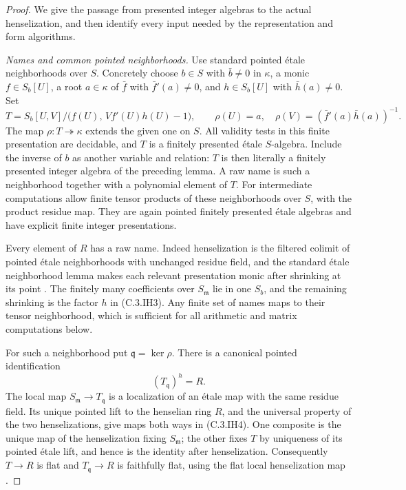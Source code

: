 \begin{proof}
We give the passage from presented integer algebras to the actual
henselization, and then identify every input needed by the representation
and form algorithms.

\emph{Names and common pointed neighborhoods.}
Use standard pointed \'etale neighborhoods over $S$.
Concretely choose $b\in S$ with $\bar b\ne0$ in $\kappa$, a monic
$f\in S_b[U]$, a root $a\in\kappa$ of $\bar f$ with
$\bar f'(a)\ne0$, and $h\in S_b[U]$ with $\bar h(a)\ne0$.
Set
\[
 T=S_b[U,V]/\bigl(f(U),\,Vf'(U)h(U)-1\bigr),\qquad
 \rho(U)=a,\quad \rho(V)=(\bar f'(a)\bar h(a))^{-1}.       \tag{C.3.IH3}
\]
The map $\rho:T\twoheadrightarrow\kappa$ extends the given one on $S$.
All validity tests in this finite presentation are decidable, and $T$ is
a finitely presented \'etale $S$-algebra.
Include the inverse of $b$ as another variable and relation: $T$ is then
literally a finitely presented integer algebra of the preceding lemma.
A raw name is such a neighborhood together with a polynomial element of $T$.
For intermediate computations allow finite tensor products of these
neighborhoods over $S$, with the product residue map.
They are again pointed finitely presented \'etale algebras and have explicit
finite integer presentations.

Every element of $R$ has a raw name.
Indeed henselization is the filtered colimit of pointed \'etale neighborhoods
with unchanged residue field, and the standard \'etale neighborhood lemma
makes each relevant presentation monic after shrinking at its point
\cite[Tag 0BSK, Lemma 10.155.1; Tag 00UE, Proposition 10.144.4]
 {C-StacksHenselianEffective}.
The finitely many coefficients over $S_{\mathfrak m}$ lie in one $S_b$,
and the remaining shrinking is the factor $h$ in (C.3.IH3).
Any finite set of names maps to their tensor neighborhood, which is
sufficient for all arithmetic and matrix computations below.

For such a neighborhood put $\mathfrak q=\ker\rho$.
There is a canonical pointed identification
\[
                      (T_{\mathfrak q})^h=R.             \tag{C.3.IH4}
\]
The local map $S_{\mathfrak m}\to T_{\mathfrak q}$ is a localization
of an \'etale map with the same residue field.  Its unique pointed lift
to the henselian ring $R$, and the universal property of the two
henselizations, give maps both ways in (C.3.IH4).
One composite is the unique map of the henselization fixing
$S_{\mathfrak m}$; the other fixes $T$ by uniqueness of its pointed
\'etale lift, and hence is the identity after henselization.
Consequently $T\to R$ is flat and $T_{\mathfrak q}\to R$ is faithfully
flat, using the flat local henselization map
\cite[Tag 07QL, Lemma 15.46.1(1); proof of Lemma 15.46.3(c)]
 {C-StacksHenselianEffective}.


\end{proof}
